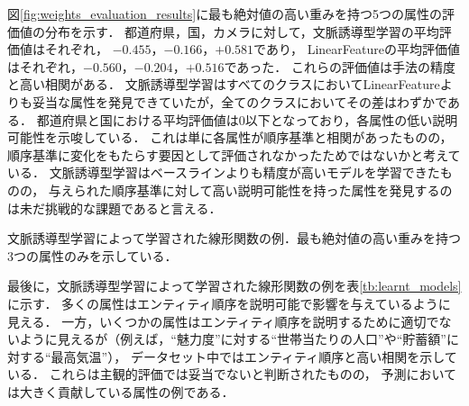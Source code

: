 図\ref{fig:weights_evaluation_results}に最も絶対値の高い重みを持つ5つの属性の評価値の分布を示す．
都道府県，国，カメラに対して，文脈誘導型学習の平均評価値はそれぞれ，
$-0.455$，$-0.166$，$+0.581$であり，
LinearFeatureの平均評価値はそれぞれ，$-0.560$，$-0.204$，$+0.516$であった．
これらの評価値は手法の精度と高い相関がある．
文脈誘導型学習はすべてのクラスにおいてLinearFeatureよりも妥当な属性を発見できていたが，全てのクラスにおいてその差はわずかである．
都道府県と国における平均評価値は0以下となっており，各属性の低い説明可能性を示唆している．
これは単に各属性が順序基準と相関があったものの，
順序基準に変化をもたらす要因として評価されなかったためではないかと考えている．
文脈誘導型学習はベースラインよりも精度が高いモデルを学習できたものの，
与えられた順序基準に対して高い説明可能性を持った属性を発見するのは未だ挑戦的な課題であると言える．

\begin{table}[t]
\centering
\caption{文脈誘導型学習によって学習された線形関数の例．最も絶対値の高い重みを持つ3つの属性のみを示している．
}
\scalebox{0.725}{

}
\label{tb:learnt_models}
\end{table}

最後に，文脈誘導型学習によって学習された線形関数の例を表\ref{tb:learnt_models}に示す．
多くの属性はエンティティ順序を説明可能で影響を与えているように見える．
一方，いくつかの属性はエンティティ順序を説明するために適切でないように見えるが（例えば，``魅力度''に対する``世帯当たりの人口''や``貯蓄額''に対する``最高気温''），
データセット中ではエンティティ順序と高い相関を示している．
これらは主観的評価では妥当でないと判断されたものの，
予測においては大きく貢献している属性の例である．


